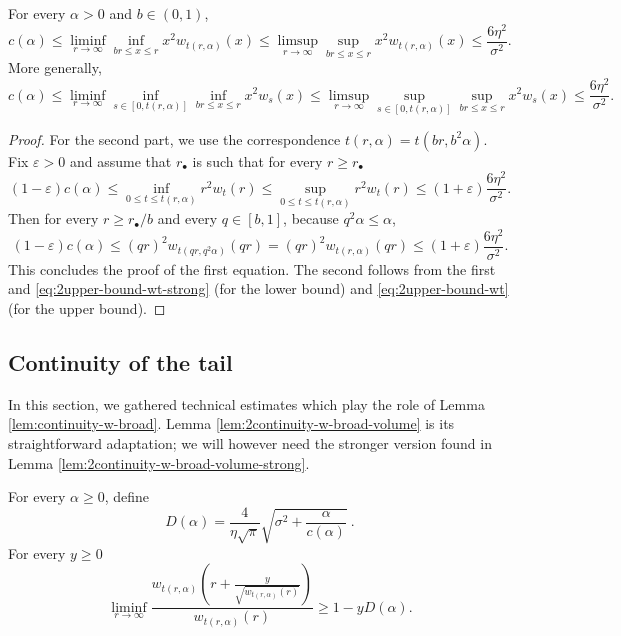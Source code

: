 \documentclass[10pt,a4paper]{article}
\begin{document}
\begin{corollary}\label{cor:2uniform-limit-r2wt}
For every $\alpha>0$ and $b \in (0,1)$, 
\[ c(\alpha) \leq \liminf_{r\to\infty} \inf_{br \leq x \leq r} x^2 w_{t(r,\alpha)}(x) \leq \limsup_{r\to\infty} \sup_{br \leq x \leq r} x^2 w_{t(r,\alpha)}(x) \leq \frac{6\eta^2}{\sigma^2} . \]
More generally, 
\[ c(\alpha) \leq \liminf_{r\to\infty} \inf_{s\in [0,t(r,\alpha)]} \inf_{br \leq x \leq r} x^2 w_{s}(x) \leq \limsup_{r\to\infty} \sup_{s\in [0,t(r,\alpha)]}  \sup_{br \leq x \leq r} x^2 w_{s}(x) \leq \frac{6\eta^2}{\sigma^2} . \]
\end{corollary}

\begin{proof}
For the second part, we use the correspondence $t(r,\alpha) = t(br, b^2 \alpha)$. Fix $\varepsilon>0$ and assume that $r_\bullet$ is such that for every $r\geq r_\bullet$
\[ (1-\varepsilon)c(\alpha) \leq \inf_{0\leq t \leq t(r,\alpha)} r^2 w_t(r) \leq \sup_{0\leq t \leq t(r,\alpha)} r^2 w_t(r) \leq (1+\varepsilon) \frac{6\eta^2}{\sigma^2} . \] 
Then for every $r\geq r_\bullet/b$ and every $q \in [b,1]$, because $q^2 \alpha \leq \alpha$, 
\[ (1-\varepsilon)c(\alpha) \leq (qr)^2 w_{t(qr, q^2 \alpha)}(qr) = (qr)^2 w_{t(r, \alpha)}(qr) \leq (1+\varepsilon) \frac{6\eta^2}{\sigma^2} . \]
This concludes the proof of the first equation. The second follows from the first and \eqref{eq:2upper-bound-wt-strong} (for the lower bound) and \eqref{eq:2upper-bound-wt} (for the upper bound). 
\end{proof}









\subsection{Continuity of the tail}
\label{sec:2continuity-tail}


In this section, we gathered technical estimates which play the role of Lemma \ref{lem:continuity-w-broad}. Lemma \ref{lem:2continuity-w-broad-volume} is its straightforward adaptation; we will however need the stronger version found in Lemma \ref{lem:2continuity-w-broad-volume-strong}. 




\begin{lemma}\label{lem:2continuity-w-broad-volume}
For every $\alpha\geq 0$, 
define 
\[ D(\alpha) = \frac{4}{\eta\sqrt{\pi}} \sqrt{\sigma^2 + \frac{\alpha}{c(\alpha)}} \ . \]
For every $y\geq 0$
\begin{equation}\label{eq:2continuity-ratio-vol-right}
\liminf_{r\to\infty} \frac{w_{t(r, \alpha)}\left(r + \frac{y}{\sqrt{w_{t(r, \alpha)}(r)}}\right)}{w_{t(r, \alpha)}(r)} \geq 1 - y D(\alpha) .
\end{equation}
\end{lemma}
\end{document}
